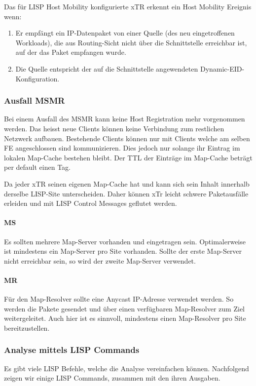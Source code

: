 Das für LISP Host Mobility konfigurierte xTR erkennt ein Host Mobility Ereignis wenn:
\begin{enumerate}
	\item Er empfängt ein IP-Datenpaket von einer Quelle (des neu eingetroffenen Workloads), die aus Routing-Sicht nicht über die Schnittstelle erreichbar ist, auf der das Paket empfangen wurde.
	\item Die Quelle entspricht der auf die Schnittstelle angewendeten Dynamic-EID-Konfiguration.
\end{enumerate}


\subsubsection{Ausfall MSMR}
Bei einem Ausfall des MSMR kann keine Host Registration mehr vorgenommen werden. Das heisst neue Clients können keine Verbindung zum restlichen Netzwerk aufbauen. Bestehende Clients können nur mit Clients welche am selben FE angeschlossen sind kommunizieren. Dies jedoch nur solange ihr Eintrag im lokalen Map-Cache bestehen bleibt. Der TTL der Einträge im Map-Cache beträgt per default einen Tag. 

Da jeder xTR seinen eigenen Map-Cache hat und kann sich sein Inhalt innerhalb derselbe LISP-Site unterscheiden. Daher können xTr leicht schwere Paketausfälle erleiden und mit LISP Control Messages geflutet werden.  

\paragraph{MS}
Es sollten mehrere Map-Server vorhanden und eingetragen sein. Optimalerweise ist mindestens ein Map-Server pro Site vorhanden. Sollte der erste Map-Server nicht erreichbar sein, so wird der zweite Map-Server verwendet.

\paragraph{MR}
Für den Map-Resolver sollte eine Anycast IP-Adresse verwendet werden. So werden die Pakete gesendet und über einen verfügbaren Map-Resolver zum Ziel weitergeleitet. Auch hier ist es sinnvoll, mindestens einen Map-Resolver pro Site bereitzustellen.

\subsubsection{Analyse mittels LISP Commands}
Es gibt viele LISP Befehle, welche die Analyse vereinfachen können. Nachfolgend zeigen wir einige LISP Commands, zusammen mit den ihren Ausgaben. \cite{lisp-commands}

